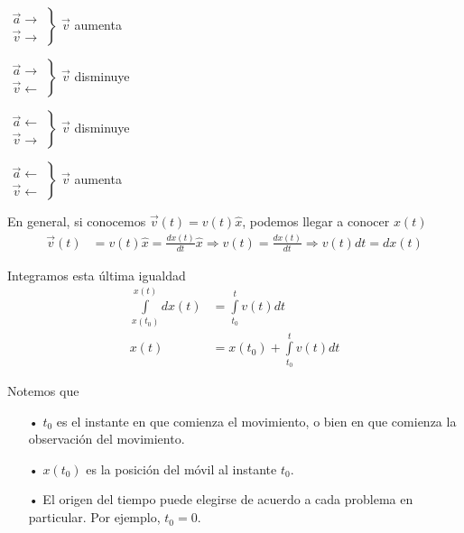 \begin{example}
  \begin{multicols}{2}
    \hspace{10pt}
    $\left.\begin{array}{rcl}
    \vec{a} \longrightarrow\\ 
    \vec{v} \longrightarrow 
    \end{array}\right\}$ $\vec{v}$ aumenta
    
    \noindent
    $\left.\begin{array}{rcl}
    \vec{a} \longrightarrow\\ 
    \vec{v} \longleftarrow 
    \end{array}\right\}$ $\vec{v}$ disminuye
  \end{multicols}
  
  \begin{multicols}{2}
    \hspace{10pt}
    $\left.\begin{array}{rcl}
    \vec{a} \longleftarrow\\ 
    \vec{v} \longrightarrow 
    \end{array}\right\}$ $\vec{v}$ disminuye
    
    \noindent
    $\left.\begin{array}{rcl}\vec{a} \longleftarrow\\ 
    \vec{v} \longleftarrow \end{array}\right\}$ $\vec{v}$ aumenta
  \end{multicols}
\end{example}

En general, si conocemos $\vec{v}(t)= v(t)\hat{x}$, podemos llegar a conocer $x(t)$
\begin{align*}
  \vec{v}(t) &= v(t)\hat{x} = \frac{dx(t)}{dt}\hat{x} \Longrightarrow v(t) = \frac{dx(t)}{dt} \Longrightarrow
  v(t) dt = dx(t)
\end{align*}

Integramos esta última igualdad
\begin{align*}
  \int\limits_{x(t_0)}^{x(t)}dx(t) &= \int\limits_{t_0}^{t}v(t)dt \\
  x(t) &= x(t_0) + \int\limits_{t_0}^{t}v(t)dt
\end{align*}

Notemos que
\begin{itemize}[noitemsep]
  \item [•] $t_0$ es el instante en que comienza el movimiento, o bien en que comienza la observación del movimiento.
  \item [•] $x(t_0)$ es la posición del móvil al instante $t_0$.
  \item [•] El origen del tiempo puede elegirse de acuerdo a cada problema en particular. Por ejemplo, $t_0 = 0$.
\end{itemize}

